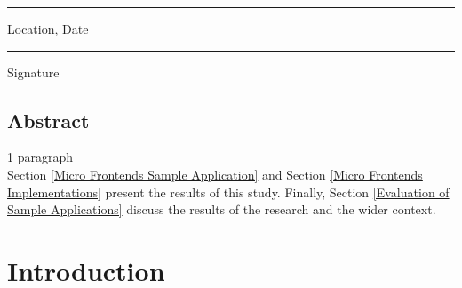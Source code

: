 \documentclass[a4paper]{book}
\begin{document}
\vspace{2cm}

\begin{minipage}[t]{7cm}
\rule{5cm}{0.1mm}
\flushleft
Location, Date
\end{minipage}
\null\hfill
\begin{minipage}[t]{7cm}
\rule{7cm}{0.1mm}
\flushleft
Signature
\end{minipage}





\clearpage
\section*{Abstract}
1 paragraph \\

Section \ref{Micro Frontends Sample Application} and Section \ref{Micro Frontends Implementations} present the results of this study. Finally, Section \ref{Evaluation of Sample Applications} discuss the results of the research and the wider context. 


\tableofcontents           %
\listoffigures             %
\listoftables              %

\clearpage


\chapter{Introduction}
\end{document}
